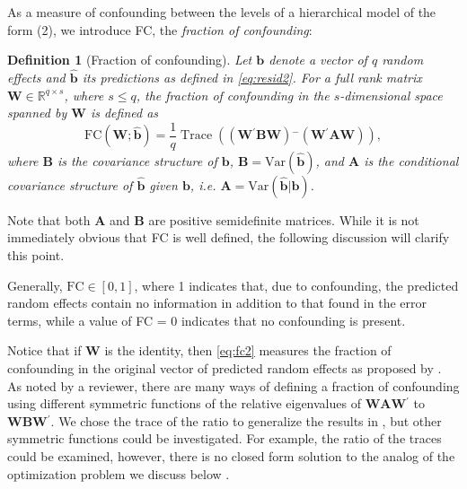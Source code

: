 \documentclass[12pt]{article} %
\newtheorem{definition}{Definition}
\newcommand{\ginv}{\ensuremath{^{-}}}
\newcommand{\trans}{\ensuremath{^\prime}}
\newcommand{\var}{\ensuremath{\mathrm{Var}}}
\DeclareMathOperator{\tr}{Trace}
\begin{document}
As a measure of confounding between the levels of a hierarchical model of the form (2), we introduce FC, the {\it fraction of confounding}:
\begin{definition}[Fraction of confounding] 
Let $\bm{b}$ denote a vector of $q$ random effects and $\widehat{\bm{b}}$ its predictions as defined in \eqref{eq:resid2}. For a full rank matrix $\bm{W} \in \mathbb{R}^{q \times s}$, where $ s \le q$, the fraction of confounding in the $s$-dimensional space spanned by $\bm{W}$ is defined as 
\begin{equation}\label{eq:fc2}
\text{FC}(\bm{W}; \widehat{\bm{b}}) = \frac{1}{q} \tr\left( \left(\bm{W\trans B W} \right)\ginv \left(\bm{W\trans A W}\right) \right),
\end{equation}
where $\bm{B}$ is the covariance structure of $\bm b$, $\bm{B} = \var(\widehat{\bm{b}})$, and $\bm{A}$ is the conditional covariance structure of  $\widehat{\bm{b}}$ given $\bm{b}$,  i.e. $\bm{A} = \var(\widehat{\bm{b}} | \bm{b} )$.
\end{definition}
\noindent
Note that both $\bm{A}$ and $\bm{B}$ are  positive semidefinite matrices. While it is not immediately obvious that FC %
is well defined,  the following discussion will clarify this point. %

Generally, $\text{FC} \in [0,1]$, where 1 indicates that, due to confounding, the predicted random effects contain no information in addition to that found in the error terms, while a value of FC = 0 indicates that no confounding is present. 

Notice that if $\bm{W}$ is the identity, then \eqref{eq:fc2} measures the fraction of confounding in the original vector of predicted random effects as proposed by  \cite{HildenMinton:1995wh}. As noted by a reviewer, there are many ways of defining a fraction of confounding using different symmetric functions of the relative eigenvalues of $\bm{WAW}\trans$ to $\bm{WBW}\trans$. We chose the trace of the ratio to generalize the results in \cite{HildenMinton:1995wh}, but other symmetric functions could be investigated. For example, the ratio of the traces could be examined, however, there is no closed form solution to the analog of the optimization problem we discuss below \citep[cf.,][]{Jia:2009ux}. 
\end{document}
